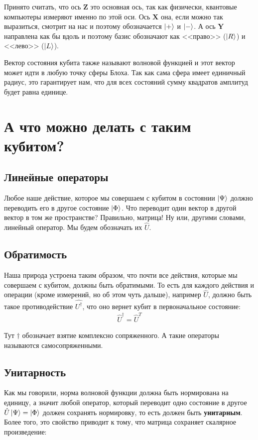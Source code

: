 \documentclass[11pt]{article}
\begin{document}
Принято считать, что ось \(\mathbf{Z}\) это основная ось, так как физически, квантовые компьютеры измеряют именно по этой оси. Ось \(\mathbf{X}\) она, если можно так выразиться, смотрит на нас и поэтому обозначается \(\ket{+}\) и \(\ket{-}\). А ось \(\mathbf{Y}\) направлена как бы вдоль и поэтому базис обозначают как {}<<право>>{} (\(\ket{R}\)) и {}<<лево>>{} (\(\ket{L}\)).

Вектор состояния кубита также называют волновой функцией и этот вектор может идти в любую точку сферы Блоха. Так как сама сфера имеет единичный радиус, это гарантирует нам, что для всех состояний сумму квадратов амплитуд будет равна единице.

\section{А что можно делать с таким кубитом?}
\label{sec:orgd0e8445}
\subsection{Линейные операторы}
\label{sec:org78eaed1}
Любое наше действие, которое мы совершаем с кубитом в состоянии \(\ket{\Psi}\) должно переводить его в другое состояние \(\ket{\Phi}\). Что переводит один вектор в другой вектор в том же пространстве? Правильно, матрица! Ну или, другими словами, линейный оператор. Мы будем обозначать их \(\hat{U}\).

\subsection{Обратимость}
\label{sec:org2590de2}
Наша природа устроена таким образом, что почти все действия, которые мы совершаем с кубитом, должны быть обратимыми. То есть для каждого действия и операции (кроме измерений, но об этом чуть дальше), например \(\hat{U}\), должно быть такое противодействие \(\hat{U^\dagger}\), что оно вернет кубит в первоначальное состояние:
\begin{align*}
\hat{U}^\dagger = \hat{U}^T
\end{align*}

Тут \(\dagger\) обозначает взятие комплексно сопряженного. А такие операторы называются самосопряженными.

\subsection{Унитарность}
\label{sec:orgb87a664}
Как мы говорили, норма волновой функции должна быть нормирована на единицу, а значит любой оператор, который переводит одно состояние в другое \(\hat{U}\ket{\Psi} = \ket{\Phi}\) должен сохранять нормировку, то есть должен быть \textbf{унитарным}. Более того, это свойство приводит к тому, что матрица сохраняет скалярное произведение:
\end{document}
